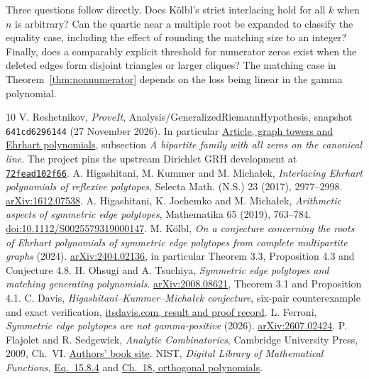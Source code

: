 \documentclass[11pt,letterpaper]{article}
\theoremstyle{remark}\newtheorem{remark}[theorem]{Remark}
\begin{document}
Three questions follow directly. Does K\"olbl's strict interlacing hold
for all $k$ when $n$ is arbitrary? Can the quartic near a multiple
root be expanded to classify the equality case, including the effect
of rounding the matching size to an integer? Finally, does a comparably explicit threshold for numerator zeros exist
when the deleted edges form disjoint triangles or larger cliques? The
matching case in Theorem~\ref{thm:nonnumerator} depends on the loss
being linear in the gamma polynomial.

\small\begin{thebibliography}{10}\setlength{\itemsep}{3pt}
 V. Reshetnikov, \emph{ProveIt}, Analysis/GeneralizedRiemannHypothesis,
snapshot \texttt{641cd6296144} (27 November 2026). In particular
\href{https://github.com/VladimirReshetnikov/ProveIt/blob/641cd6296144d7c29bcc6569655b473647428b1b/Analysis/GeneralizedRiemannHypothesis/Article/sections/gra.tex}{Article, graph towers and Ehrhart polynomials},
subsection \emph{A bipartite family with all zeros on the canonical line}.
The project pins the upstream Dirichlet GRH development at
\href{https://github.com/lsernau/grh-lean/tree/72fead102f663d5c7a407964a13dc0cf9d977207}{\texttt{72fead102f66}}.
 A. Higashitani, M. Kummer and M. Micha\l ek,
\emph{Interlacing Ehrhart polynomials of reflexive polytopes},
Selecta Math. (N.S.) 23 (2017), 2977--2998.
\href{https://arxiv.org/abs/1612.07538}{arXiv:1612.07538}.
 A. Higashitani, K. Jochemko and M. Micha\l ek,
\emph{Arithmetic aspects of symmetric edge polytopes}, Mathematika 65
(2019), 763--784.
\href{https://doi.org/10.1112/S0025579319000147}{doi:10.1112/S0025579319000147}.
 M. K\"olbl, \emph{On a conjecture concerning the roots of
Ehrhart polynomials of symmetric edge polytopes from complete multipartite
graphs} (2024). \href{https://arxiv.org/abs/2404.02136}{arXiv:2404.02136},
in particular Theorem 3.3, Proposition 4.3 and Conjecture 4.8.
 H. Ohsugi and A. Tsuchiya, \emph{Symmetric edge polytopes
and matching generating polynomials}.
\href{https://arxiv.org/abs/2008.08621}{arXiv:2008.08621}, Theorem 3.1
and Proposition 4.1.
 C. Davis, \emph{Higashitani--Kummer--Micha\l ek conjecture},
six-pair counterexample and exact verification,
\href{https://itsdavis.com/solved-conjectures/results/hkm-ehrhart/}{itsdavis.com, result and proof record}.
 L. Ferroni, \emph{Symmetric edge polytopes are not
gamma-positive} (2026).
\href{https://arxiv.org/abs/2607.02424}{arXiv:2607.02424}.
 P. Flajolet and R. Sedgewick, \emph{Analytic Combinatorics},
Cambridge University Press, 2009, Ch.~VI.
\href{https://ac.cs.princeton.edu/home/}{Authors' book site}.
 NIST, \emph{Digital Library of Mathematical Functions},
\href{https://dlmf.nist.gov/15.8.E4}{Eq.~15.8.4} and
\href{https://dlmf.nist.gov/18}{Ch.~18, orthogonal polynomials}.
\end{thebibliography}
\end{document}
